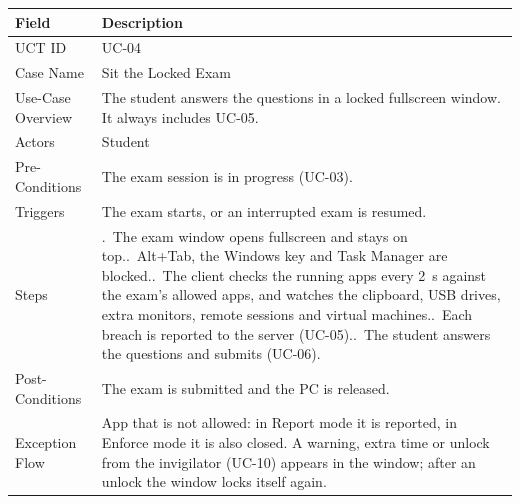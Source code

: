 \begin{lrbox}{\uctbox}{\small\renewcommand{\arraystretch}{1.1}\setlength{\tabcolsep}{6pt}%
\begin{tabular}{>{\raggedright\arraybackslash}p{3.6cm}>{\raggedright\arraybackslash}p{\dimexpr\textwidth-3.6cm-4\tabcolsep\relax}}
\hline\hline
\textbf{Field} & \textbf{Description} \\ \hline
UCT ID & UC-04 \\
Case Name & Sit the Locked Exam \\
Use-Case Overview & The student answers the questions in a locked fullscreen window. It always includes UC-05. \\
Actors & Student \\
Pre-Conditions & The exam session is in progress (UC-03). \\
Triggers & The exam starts, or an interrupted exam is resumed. \\
Steps & 1.~The exam window opens fullscreen and stays on top.\newline
2.~Alt+Tab, the Windows key and Task Manager are blocked.\newline
3.~The client checks the running apps every 2~s against the exam's allowed apps, and watches the clipboard, USB drives, extra monitors, remote sessions and virtual machines.\newline
4.~Each breach is reported to the server (UC-05).\newline
5.~The student answers the questions and submits (UC-06). \\
Post-Conditions & The exam is submitted and the PC is released. \\
Exception Flow & App that is not allowed: in Report mode it is reported, in Enforce mode it is also closed. A warning, extra time or unlock from the invigilator (UC-10) appears in the window; after an unlock the window locks itself again. \\
\hline\hline
\end{tabular}}\end{lrbox}
\begin{table}[H]
\centering
\caption{Use Case Table for Sit the Locked Exam}\label{tab:uc04}
\vspace{4pt}
\usebox{\uctbox}
\end{table}

